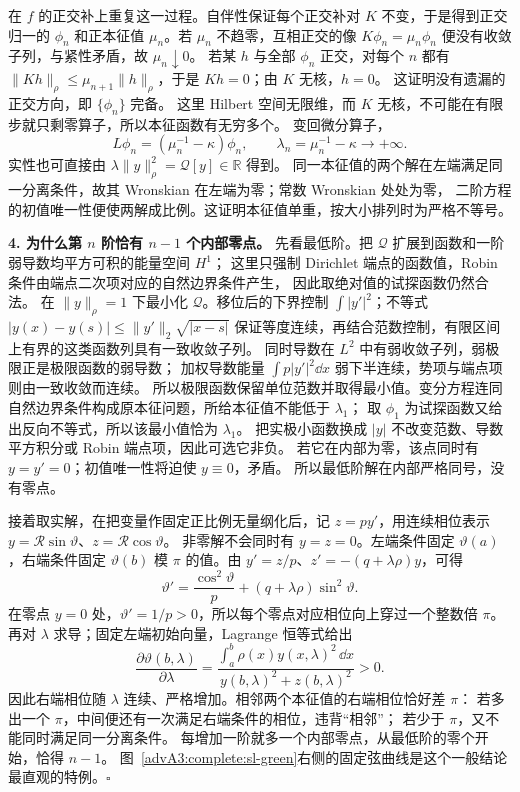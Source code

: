 在 $f$ 的正交补上重复这一过程。自伴性保证每个正交补对 $K$ 不变，于是得到正交归一的
$\phi_n$ 和正本征值 $\mu_n$。若 $\mu_n$ 不趋零，互相正交的像 $K\phi_n=\mu_n\phi_n$
便没有收敛子列，与紧性矛盾，故 $\mu_n\downarrow0$。
若某 $h$ 与全部 $\phi_n$ 正交，对每个 $n$ 都有
$\|Kh\|_\rho\le\mu_{n+1}\|h\|_\rho$，于是 $Kh=0$；由 $K$ 无核，$h=0$。
这证明没有遗漏的正交方向，即 $\{\phi_n\}$ 完备。
这里 Hilbert 空间无限维，而 $K$ 无核，不可能在有限步就只剩零算子，所以本征函数有无穷多个。
变回微分算子，
\[
 L\phi_n=(\mu_n^{-1}-\kappa)\phi_n,\qquad
 \lambda_n=\mu_n^{-1}-\kappa\longrightarrow+\infty.
\]
实性也可直接由 $\lambda\|y\|_\rho^2=\mathcal Q[y]\in\mathbb R$ 得到。
同一本征值的两个解在左端满足同一分离条件，故其 Wronskian 在左端为零；常数 Wronskian 处处为零，
二阶方程的初值唯一性便使两解成比例。这证明本征值单重，按大小排列时为严格不等号。

\textbf{4. 为什么第 $n$ 阶恰有 $n-1$ 个内部零点。}
先看最低阶。把 $\mathcal Q$ 扩展到函数和一阶弱导数均平方可积的能量空间 $H^1$；
这里只强制 Dirichlet 端点的函数值，Robin 条件由端点二次项对应的自然边界条件产生，
因此取绝对值的试探函数仍然合法。
在 $\|y\|_\rho=1$ 下最小化 $\mathcal Q$。移位后的下界控制 $\int|y'|^2$；不等式
$|y(x)-y(s)|\le\|y'\|_2\sqrt{|x-s|}$ 保证等度连续，再结合范数控制，有限区间上有界的这类函数列具有一致收敛子列。
同时导数在 $L^2$ 中有弱收敛子列，弱极限正是极限函数的弱导数；
加权导数能量 $\int p|y'|^2\dd x$ 弱下半连续，势项与端点项则由一致收敛而连续。
所以极限函数保留单位范数并取得最小值。变分方程连同自然边界条件构成原本征问题，所给本征值不能低于 $\lambda_1$；
取 $\phi_1$ 为试探函数又给出反向不等式，所以该最小值恰为 $\lambda_1$。
把实极小函数换成 $|y|$ 不改变范数、导数平方积分或 Robin 端点项，因此可选它非负。
若它在内部为零，该点同时有 $y=y'=0$；初值唯一性将迫使 $y\equiv0$，矛盾。
所以最低阶解在内部严格同号，没有零点。

接着取实解，在把变量作固定正比例无量纲化后，记 $z=py'$，用连续相位表示
$y=\mathcal R\sin\vartheta$、$z=\mathcal R\cos\vartheta$。
非零解不会同时有 $y=z=0$。左端条件固定 $\vartheta(a)$，右端条件固定
$\vartheta(b)$ 模 $\pi$ 的值。由 $y'=z/p$、$z'=-(q+\lambda\rho)y$，可得
\[
 \vartheta'=\frac{\cos^2\vartheta}{p}+(q+\lambda\rho)\sin^2\vartheta.
\]
在零点 $y=0$ 处，$\vartheta'=1/p>0$，所以每个零点对应相位向上穿过一个整数倍 $\pi$。
再对 $\lambda$ 求导；固定左端初始向量，Lagrange 恒等式给出
\[
 \frac{\partial\vartheta(b,\lambda)}{\partial\lambda}
 =\frac{\int_a^b\rho(x)y(x,\lambda)^2\,\dd x}{y(b,\lambda)^2+z(b,\lambda)^2}>0.
\]
因此右端相位随 $\lambda$ 连续、严格增加。相邻两个本征值的右端相位恰好差 $\pi$：
若多出一个 $\pi$，中间便还有一次满足右端条件的相位，违背“相邻”；
若少于 $\pi$，又不能同时满足同一分离条件。
每增加一阶就多一个内部零点，从最低阶的零个开始，恰得 $n-1$。
图~\ref{advA3:complete:sl-green}右侧的固定弦曲线是这个一般结论最直观的特例。\hfill$\square$
